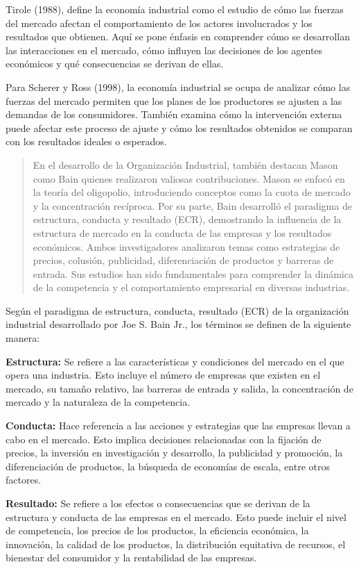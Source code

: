 \documentclass[
  a4paper,
]{article}
\begin{document}
Tirole (1988), define la economía industrial como el estudio de cómo las
fuerzas del mercado afectan el comportamiento de los actores
involucrados y los resultados que obtienen. Aquí se pone énfasis en
comprender cómo se desarrollan las interacciones en el mercado, cómo
influyen las decisiones de los agentes económicos y qué consecuencias se
derivan de ellas.

Para Scherer y Ross (1998), la economía industrial se ocupa de analizar
cómo las fuerzas del mercado permiten que los planes de los productores
se ajusten a las demandas de los consumidores. También examina cómo la
intervención externa puede afectar este proceso de ajuste y cómo los
resultados obtenidos se comparan con los resultados ideales o esperados.

\begin{quote}
En el desarrollo de la Organización Industrial, también destacan Mason
como Bain quienes realizaron valiosas contribuciones. Mason se enfocó en
la teoría del oligopolio, introduciendo conceptos como la cuota de
mercado y la concentración recíproca. Por su parte, Bain desarrolló el
paradigma de estructura, conducta y resultado (ECR), demostrando la
influencia de la estructura de mercado en la conducta de las empresas y
los resultados económicos. Ambos investigadores analizaron temas como
estrategias de precios, colusión, publicidad, diferenciación de
productos y barreras de entrada. Sus estudios han sido fundamentales
para comprender la dinámica de la competencia y el comportamiento
empresarial en diversas industrias.
\end{quote}

Según el paradigma de estructura, conducta, resultado (ECR) de la
organización industrial desarrollado por Joe S. Bain Jr., los términos
se definen de la siguiente manera:

\textbf{Estructura:} Se refiere a las características y condiciones del
mercado en el que opera una industria. Esto incluye el número de
empresas que existen en el mercado, su tamaño relativo, las barreras de
entrada y salida, la concentración de mercado y la naturaleza de la
competencia.

\textbf{Conducta:} Hace referencia a las acciones y estrategias que las
empresas llevan a cabo en el mercado. Esto implica decisiones
relacionadas con la fijación de precios, la inversión en investigación y
desarrollo, la publicidad y promoción, la diferenciación de productos,
la búsqueda de economías de escala, entre otros factores.

\textbf{Resultado:} Se refiere a los efectos o consecuencias que se
derivan de la estructura y conducta de las empresas en el mercado. Esto
puede incluir el nivel de competencia, los precios de los productos, la
eficiencia económica, la innovación, la calidad de los productos, la
distribución equitativa de recursos, el bienestar del consumidor y la
rentabilidad de las empresas.
\end{document}
